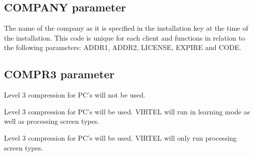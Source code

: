 \documentclass[letterpaper,10pt,english]{sphinxmanual}
\begin{document}
\ignorespaces 

\subsection{COMPANY parameter}
\label{\detokenize{Installation_Guide:company-parameter}}\label{\detokenize{Installation_Guide:index-45}}
\begin{sphinxVerbatim}[commandchars=\\\{\}]
 
\end{sphinxVerbatim}

\sphinxAtStartPar
The name of the company as it is specified in the installation key at the time of the installation. This code is unique for
each client and functions in relation to the following parameters: ADDR1, ADDR2, LICENSE, EXPIRE and CODE.

\ignorespaces 

\subsection{COMPR3 parameter}
\label{\detokenize{Installation_Guide:compr3-parameter}}\label{\detokenize{Installation_Guide:index-46}}
\begin{sphinxVerbatim}[commandchars=\\\{\}]
 
\end{sphinxVerbatim}

\sphinxAtStartPar
{} \sphinxhyphen{} Level 3 compression for PC’s will not be used.

\sphinxAtStartPar
{} \sphinxhyphen{} Level 3 compression for PC’s will be used. VIRTEL will run in learning mode as well as processing screen types.

\sphinxAtStartPar
{} \sphinxhyphen{} Level 3 compression for PC’s will be used. VIRTEL will only run processing screen types.
\end{document}
